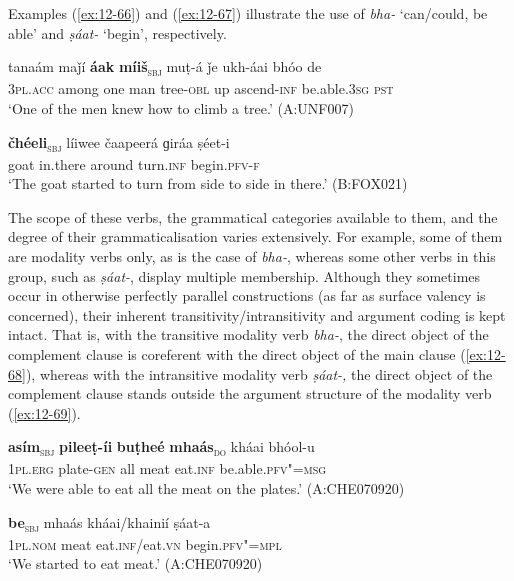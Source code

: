 Examples (\ref{ex:12-66}) and (\ref{ex:12-67}) illustrate the use of \textit{bha-} `can/could, be able' and \textit{ṣáat-} `begin', respectively.
\begin{exe}
\ex
\label{ex:12-66}
\gll tanaám maǰí {\ob}\textbf{áak} \textbf{míiš}{\cb}\textsubscript{\textsc{\upshape sbj}} muṭ-á ǰe ukh-áai bhóo de \\
\textsc{3pl.acc} among one man tree-\textsc{obl} up ascend-\textsc{inf}  be.able.\textsc{3sg} \textsc{pst} \\
\glt `One of the men knew how to climb a tree.' (A:UNF007)
\end{exe}
\begin{exe}
\ex
\label{ex:12-67}
\gll {\ob}\textbf{čhéeli}{\cb}\textsubscript{\textsc{\upshape sbj}} líiwee čaapeerá ɡiráa ṣéet-i \\
goat in.there around turn.\textsc{inf} begin.\textsc{pfv-f} \\
\glt `The goat started to turn from side to side in there.' (B:FOX021)
\end{exe}

The scope of these verbs, the grammatical categories available to them, and the degree of their grammaticalisation varies extensively. For example, some of them are modality verbs only, as is the case of \textit{bha-}, whereas some other verbs in this group, such as \textit{ṣáat-}, display multiple membership. Although they sometimes occur in otherwise perfectly parallel constructions (as far as surface valency is concerned), their inherent transitivity/intransitivity and argument coding is kept intact. That is, with the transitive modality verb \textit{bha-}, the direct object of the complement clause is coreferent with the direct object of the main clause (\ref{ex:12-68}), whereas with the intransitive modality verb \textit{ṣáat-,} the direct object of the complement clause stands outside the argument structure of the modality verb (\ref{ex:12-69}).

\begin{exe}
\ex
\label{ex:12-68}
\gll {\ob}\textbf{asím}{\cb}\textsubscript{\textsc{\upshape sbj}} {\ob}\textbf{pileeṭ-íi} \textbf{buṭheé} \textbf{mhaás}{\cb}\textsubscript{\textsc{\upshape do}} kháai bhóol-u \\
\textsc{1pl.erg} plate-\textsc{gen} all meat eat.\textsc{inf} be.able.\textsc{pfv"=msg} \\
\glt `We were able to eat all the meat on the plates.' (A:CHE070920)
\end{exe}
\begin{exe}
\ex
\label{ex:12-69}
\gll {\ob}\textbf{be}{\cb}\textsubscript{\textsc{\upshape sbj}} mhaás kháai/khainií ṣáat-a \\
\textsc{1pl.nom} meat eat.\textsc{inf}/eat.\textsc{vn} begin.\textsc{pfv"=mpl} \\
\glt `We started to eat meat.' (A:CHE070920)
\end{exe}

